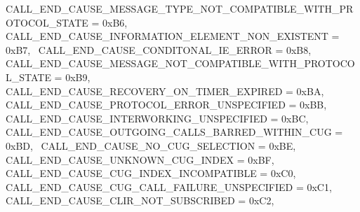 \begin{DoxyItemize}
 C\+A\+L\+L\+\_\+\+E\+N\+D\+\_\+\+C\+A\+U\+S\+E\+\_\+\+M\+E\+S\+S\+A\+G\+E\+\_\+\+T\+Y\+P\+E\+\_\+\+N\+O\+T\+\_\+\+C\+O\+M\+P\+A\+T\+I\+B\+L\+E\+\_\+\+W\+I\+T\+H\+\_\+\+P\+R\+O\+T\+O\+C\+O\+L\+\_\+\+S\+T\+A\+TE = 0x\+B6,~\newline
 C\+A\+L\+L\+\_\+\+E\+N\+D\+\_\+\+C\+A\+U\+S\+E\+\_\+\+I\+N\+F\+O\+R\+M\+A\+T\+I\+O\+N\+\_\+\+E\+L\+E\+M\+E\+N\+T\+\_\+\+N\+O\+N\+\_\+\+E\+X\+I\+S\+T\+E\+NT = 0x\+B7,~\newline
 C\+A\+L\+L\+\_\+\+E\+N\+D\+\_\+\+C\+A\+U\+S\+E\+\_\+\+C\+O\+N\+D\+I\+T\+O\+N\+A\+L\+\_\+\+I\+E\+\_\+\+E\+R\+R\+OR = 0x\+B8,~\newline
 C\+A\+L\+L\+\_\+\+E\+N\+D\+\_\+\+C\+A\+U\+S\+E\+\_\+\+M\+E\+S\+S\+A\+G\+E\+\_\+\+N\+O\+T\+\_\+\+C\+O\+M\+P\+A\+T\+I\+B\+L\+E\+\_\+\+W\+I\+T\+H\+\_\+\+P\+R\+O\+T\+O\+C\+O\+L\+\_\+\+S\+T\+A\+TE = 0x\+B9,~\newline
 C\+A\+L\+L\+\_\+\+E\+N\+D\+\_\+\+C\+A\+U\+S\+E\+\_\+\+R\+E\+C\+O\+V\+E\+R\+Y\+\_\+\+O\+N\+\_\+\+T\+I\+M\+E\+R\+\_\+\+E\+X\+P\+I\+R\+ED = 0x\+BA,~\newline
 C\+A\+L\+L\+\_\+\+E\+N\+D\+\_\+\+C\+A\+U\+S\+E\+\_\+\+P\+R\+O\+T\+O\+C\+O\+L\+\_\+\+E\+R\+R\+O\+R\+\_\+\+U\+N\+S\+P\+E\+C\+I\+F\+I\+ED = 0x\+BB,~\newline
 C\+A\+L\+L\+\_\+\+E\+N\+D\+\_\+\+C\+A\+U\+S\+E\+\_\+\+I\+N\+T\+E\+R\+W\+O\+R\+K\+I\+N\+G\+\_\+\+U\+N\+S\+P\+E\+C\+I\+F\+I\+ED = 0x\+BC,~\newline
 C\+A\+L\+L\+\_\+\+E\+N\+D\+\_\+\+C\+A\+U\+S\+E\+\_\+\+O\+U\+T\+G\+O\+I\+N\+G\+\_\+\+C\+A\+L\+L\+S\+\_\+\+B\+A\+R\+R\+E\+D\+\_\+\+W\+I\+T\+H\+I\+N\+\_\+\+C\+UG = 0x\+BD,~\newline
 C\+A\+L\+L\+\_\+\+E\+N\+D\+\_\+\+C\+A\+U\+S\+E\+\_\+\+N\+O\+\_\+\+C\+U\+G\+\_\+\+S\+E\+L\+E\+C\+T\+I\+ON = 0x\+BE,~\newline
 C\+A\+L\+L\+\_\+\+E\+N\+D\+\_\+\+C\+A\+U\+S\+E\+\_\+\+U\+N\+K\+N\+O\+W\+N\+\_\+\+C\+U\+G\+\_\+\+I\+N\+D\+EX = 0x\+BF,~\newline
 C\+A\+L\+L\+\_\+\+E\+N\+D\+\_\+\+C\+A\+U\+S\+E\+\_\+\+C\+U\+G\+\_\+\+I\+N\+D\+E\+X\+\_\+\+I\+N\+C\+O\+M\+P\+A\+T\+I\+B\+LE = 0x\+C0,~\newline
 C\+A\+L\+L\+\_\+\+E\+N\+D\+\_\+\+C\+A\+U\+S\+E\+\_\+\+C\+U\+G\+\_\+\+C\+A\+L\+L\+\_\+\+F\+A\+I\+L\+U\+R\+E\+\_\+\+U\+N\+S\+P\+E\+C\+I\+F\+I\+ED = 0x\+C1,~\newline
 C\+A\+L\+L\+\_\+\+E\+N\+D\+\_\+\+C\+A\+U\+S\+E\+\_\+\+C\+L\+I\+R\+\_\+\+N\+O\+T\+\_\+\+S\+U\+B\+S\+C\+R\+I\+B\+ED = 0x\+C2,~\newline

\end{DoxyItemize}
